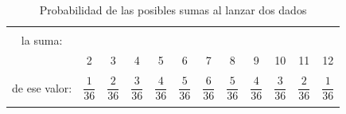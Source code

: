 \begin{ejemplo}
    \begin{table}[ht]
    \begin{center}
    {\small
    \begin{tabular}[t]{|c|c|c|c|c|c|c|c|c|c|c|c|}
    \hline
    \begin{minipage}{2cm}
    \rule{0cm}{0.5cm}{\em Valor de\\ la suma:\\}
    \end{minipage}
    &2&3&4&5&6&7&8&9&10&11&12\\
    \hline
    \begin{minipage}{2cm}
    {\em Probabilidad\\
    de ese valor:}
    \end{minipage}
    &\rule{0cm}{0.7cm}$\dfrac{1}{36}$&$\dfrac{2}{36}$&$\dfrac{3}{36}$&$\dfrac{4}{36}$&$\dfrac{5}{36}$&$\dfrac{6}{36}$&$\dfrac{5}{36}$&$\dfrac{4}{36}$&$\dfrac{3}{36}$&$\dfrac{2}{36}$&$\dfrac{1}{36}$\\
    &&&&&&&&&&&\\
    \hline
    \end{tabular}
    }
    \caption{Probabilidad de las posibles sumas al lanzar dos dados}\label{cap06:tabla:probabilidadSumaDados}
    \end{center}
    \end{table}



\end{ejemplo}
